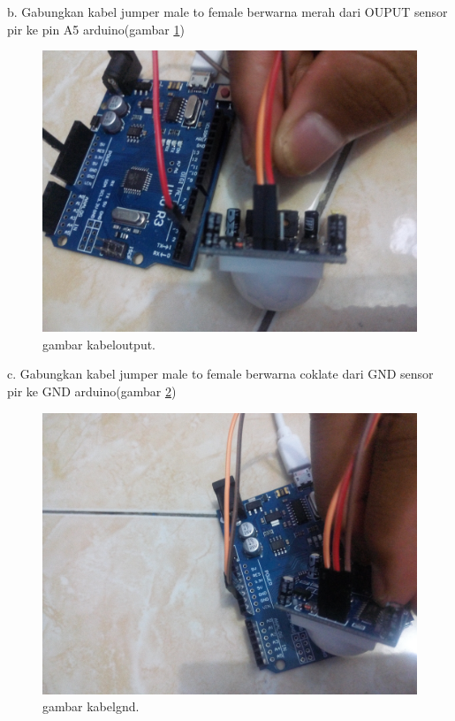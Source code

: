 b. Gabungkan kabel jumper male to female berwarna merah dari OUPUT sensor pir ke pin A5 arduino(gambar \ref{ckkabeloutput})

\begin{figure} [ht]
\centerline{\includegraphics[width=1\textwidth]{figures/kabeloutput.JPG}}
\caption{gambar kabeloutput.}
\label{ckkabeloutput}
\end{figure}

c. Gabungkan kabel jumper male to female berwarna coklate dari GND sensor pir ke GND arduino(gambar \ref{ckkabelgnd})

\begin{figure} [ht]
\centerline{\includegraphics[width=1\textwidth]{figures/kabelgnd.JPG}}
\caption{gambar kabelgnd.}
\label{ckkabelgnd}
\end{figure}

